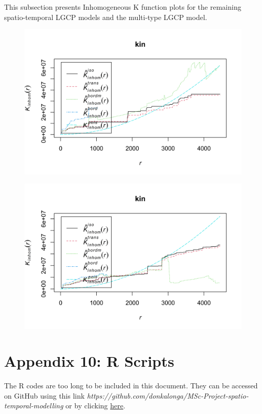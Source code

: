 \documentclass[12pt,a4paper]{report}
\begin{document}
This subsection presents Inhomogeneous K function plots for the remaining spatio-temporal LGCP models and the multi-type LGCP model.

\begin{figure}[H]
\begin{center}
\includegraphics[width=\linewidth]{Inhomogeneous K Function - Major 2.png}
\end{center}
\end{figure}

\begin{figure}[H]
\begin{center}
\includegraphics[width=\linewidth]{Inhomogeneous K Function - Major 13456.png}
\end{center}
\end{figure}

\newpage
\section*{Appendix 10: R Scripts}

The R codes are too long to be included in this document. They can be accessed on GitHub using this link \textit{https://github.com/donkalonga/MSc-Project-spatio-temporal-modelling} or by clicking \href{https://github.com/donkalonga/MSc-Project-spatio-temporal-modelling}{here}.
\end{document}
